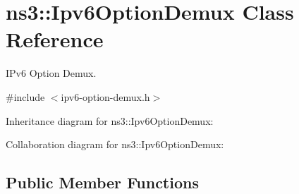 \hypertarget{classns3_1_1Ipv6OptionDemux}{}\section{ns3\+:\+:Ipv6\+Option\+Demux Class Reference}
\label{classns3_1_1Ipv6OptionDemux}


I\+Pv6 Option Demux.  




{\ttfamily \#include $<$ipv6-\/option-\/demux.\+h$>$}



Inheritance diagram for ns3\+:\+:Ipv6\+Option\+Demux\+:


Collaboration diagram for ns3\+:\+:Ipv6\+Option\+Demux\+:
\subsection*{Public Member Functions}
